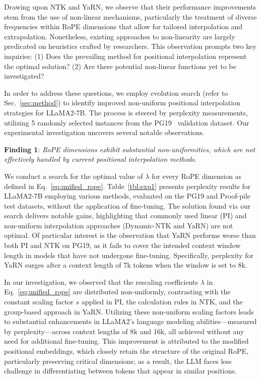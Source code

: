 Drawing upon NTK and YaRN, we observe that their performance improvements stem from the use of non-linear mechanisms, particularly the treatment of diverse frequencies within RoPE dimensions that allow for tailored interpolation and extrapolation. Nonetheless, existing approaches to non-linearity are largely predicated on heuristics crafted by researchers. This observation prompts two key inquiries: (1) Does the prevailing method for positional interpolation represent the optimal solution? (2) Are there potential non-linear functions yet to be investigated?

In order to address these questions, we employ evolution search (refer to Sec.~\ref{sec:method}) to identify improved non-uniform positional interpolation strategies for LLaMA2-7B. The process is steered by perplexity measurements, utilizing 5 randomly selected instances from the PG19~\cite{pg19} validation dataset. Our experimental investigation uncovers several notable observations.

\textbf{Finding 1}: \textit{RoPE dimensions exhibit substantial non-uniformities, which are not effectively handled by current positional interpolation methods.}

We conduct a search for the optimal value of $\lambda$ for every RoPE dimension as defined in Eq.~\ref{eq:unified_rope}. Table~\ref{tbl:exp1} presents perplexity results for LLaMA2-7B employing various methods, evaluated on the PG19 and Proof-pile~\cite{proof-pile} test datasets, without the application of fine-tuning. The solution found via our search delivers notable gains, highlighting that commonly used linear (PI) and non-uniform interpolation approaches (Dynamic-NTK and YaRN) are not optimal. Of particular interest is the observation that YaRN performs worse than both PI and NTK on PG19, as it fails to cover the intended context window length in models that have not undergone fine-tuning. Specifically, perplexity for YaRN surges after a context length of 7k tokens when the window is set to 8k.

In our investigation, we observed that the rescaling coefficients $\lambda$ in Eq.~\ref{eq:unified_rope} are distributed non-uniformly, contrasting with the constant scaling factor $s$ applied in PI, the calculation rules in NTK, and the group-based approach in YaRN. Utilizing these non-uniform scaling factors leads to substantial enhancements in LLaMA2's language modeling abilities—measured by perplexity—across context lengths of 8k and 16k, all achieved without any need for additional fine-tuning. This improvement is attributed to the modified positional embeddings, which closely retain the structure of the original RoPE, particularly preserving critical dimensions; as a result, the LLM faces less challenge in differentiating between tokens that appear in similar positions.

